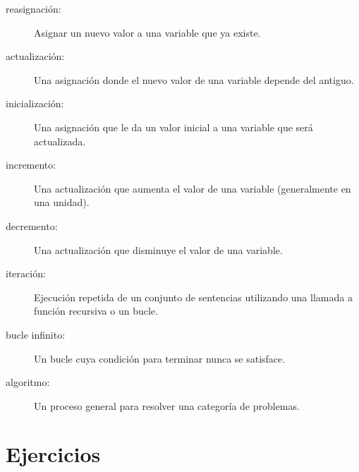 \documentclass[10pt]{book}
\begin{document}
\begin{description}

\item[reasignación:] Asignar un nuevo valor a una variable que
ya existe.

\item[actualización:] Una asignación donde el nuevo valor de una variable
depende del antiguo.

\item[inicialización:] Una asignación que le da un valor inicial a
una variable que será actualizada.

\item[incremento:] Una actualización que aumenta el valor de una variable
(generalmente en una unidad).

\item[decremento:] Una actualización que disminuye el valor de una variable.

\item[iteración:] Ejecución repetida de un conjunto de sentencias utilizando
una llamada a función recursiva o un bucle.

\item[bucle infinito:] Un bucle cuya condición para terminar nunca
se satisface.

\item[algoritmo:]  Un proceso general para resolver una categoría de
problemas.

\end{description}


\section{Ejercicios}
\end{document}
